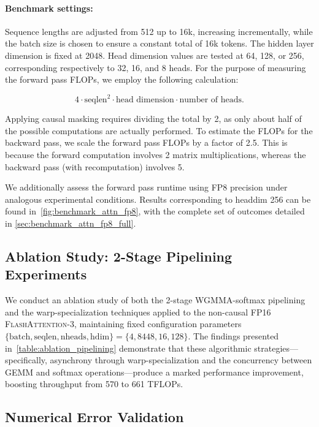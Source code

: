 \begin{algorithm}[H]
\begin{algorithmic}[1]
\begin{enumerate}
\paragraph{Benchmark settings:} Sequence lengths are adjusted from 512 up to 16k, increasing incrementally, while the batch size is chosen to ensure a constant total of 16k tokens. The hidden layer dimension is fixed at 2048. Head dimension values are tested at 64, 128, or 256, corresponding respectively to 32, 16, and 8 heads. For the purpose of measuring the forward pass FLOPs, we employ the following calculation:

\begin{equation*}
  4 \cdot \text{seqlen}^2 \cdot \text{head dimension} \cdot \text{number of heads}.
\end{equation*}

Applying causal masking requires dividing the total by 2, as only about half of the possible computations are actually performed. To estimate the FLOPs for the backward pass, we scale the forward pass FLOPs by a factor of 2.5. This is because the forward computation involves 2 matrix multiplications, whereas the backward pass (with recomputation) involves 5.

We additionally assess the forward pass runtime using FP8 precision under analogous experimental conditions. Results corresponding to headdim 256 can be found in~\cref{fig:benchmark_attn_fp8}, with the complete set of outcomes detailed in \cref{sec:benchmark_attn_fp8_full}.

\subsection{Ablation Study: 2-Stage Pipelining Experiments}
\label{sec:2-stage-pipelining-experiments}

We conduct an ablation study of both the 2-stage WGMMA-softmax pipelining and the warp-specialization techniques applied to the non-causal FP16 \textsc{FlashAttention-3}, maintaining fixed configuration parameters $\{\text{batch}, \text{seqlen}, \text{nheads}, \text{hdim}\} = \{ 4, 8448, 16, 128\}$. The findings presented in~\cref{table:ablation_pipelining} demonstrate that these algorithmic strategies—specifically, asynchrony through warp-specialization and the concurrency between GEMM and softmax operations—produce a marked performance improvement, boosting throughput from 570 to 661 TFLOPs.

\subsection{Numerical Error Validation}
\label{sec:numerical_error}


\end{enumerate}
\end{algorithmic}
\end{algorithm}
